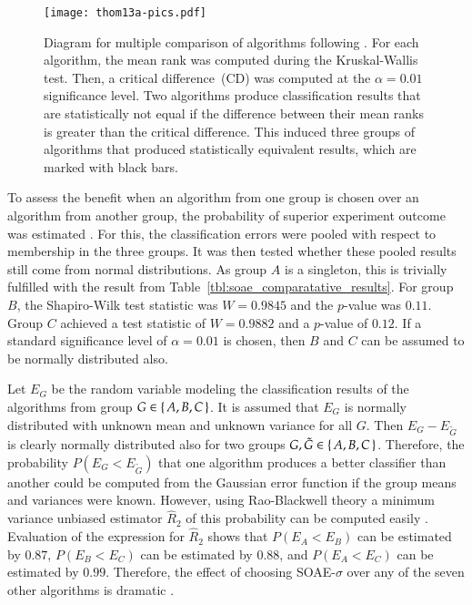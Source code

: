 \documentclass[twoside,11pt]{article}
\newcommand{\0}{\mathcal{O}}
\begin{document}
\begin{figure}[t]
  \centering
  \texttt{[image: thom13a-pics.pdf]}
  \caption{Diagram for multiple comparison of algorithms following \citet{Demsar2006}. For each algorithm, the mean rank was computed during the Kruskal-Wallis test. Then, a critical difference~(CD) was computed at the $\alpha = 0.01$ significance level. Two algorithms produce classification results that are statistically not equal if the difference between their mean ranks is greater than the critical difference. This induced three groups of algorithms that produced statistically equivalent results, which are marked with black bars.}
  \label{fig:demsar}
\end{figure}

To assess the benefit when an algorithm from one group is chosen over an algorithm from another group, the probability of superior experiment outcome was estimated \citep{Grissom1994,Acion2006}.
For this, the classification errors were pooled with respect to membership in the three groups.
It was then tested whether these pooled results still come from normal distributions.
As group $A$ is a singleton, this is trivially fulfilled with the result from Table~\ref{tbl:soae_comparatative_results}.
For group $B$, the Shapiro-Wilk test statistic was $W = 0.9845$ and the $p$-value was $0.11$.
Group $C$ achieved a test statistic of $W = 0.9882$ and a $p$-value of $0.12$.
If a standard significance level of $\alpha = 0.01$ is chosen, then $B$ and $C$ can be assumed to be normally distributed also.

Let $E_G$ be the random variable modeling the classification results of the algorithms from group $G\in\set{A, B, C}$.
It is assumed that $E_G$ is normally distributed with unknown mean and unknown variance for all $G$.
Then $E_G - E_{\tilde{G}}$ is clearly normally distributed also for two groups $G,\tilde{G}\in\set{A, B, C}$.
Therefore, the probability $P(E_G < E_{\tilde{G}})$ that one algorithm produces a better classifier than another could be computed from the Gaussian error function if the group means and variances were known.
However, using Rao-Blackwell theory a minimum variance unbiased estimator $\hat{R}_2$ of this probability can be computed easily \citep{Downton1973}.
Evaluation of the expression for $\hat{R}_2$ shows that $P(E_A < E_B)$ can be estimated by $0.87$, $P(E_B < E_C)$ can be estimated by $0.88$, and $P(E_A < E_C)$ can be estimated by $0.99$.
Therefore, the effect of choosing SOAE-$\sigma$ over any of the seven other algorithms is dramatic \citep{Grissom1994}.
\end{document}
